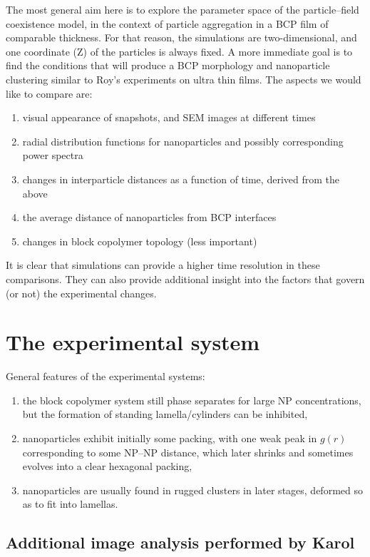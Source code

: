 The most general aim here is to explore the parameter space of the particle--field coexistence model\cite{2008-Sevink-Fraaije, 2012-Langner-Sevink}, in the context of particle aggregation in a BCP film of comparable thickness. For that reason, the simulations are two-dimensional, and one coordinate (Z) of the particles is always fixed. A more immediate goal is to find the conditions that will produce a BCP morphology and nanoparticle clustering similar to Roy's experiments on ultra thin films. The aspects we would like to compare are:
\begin{enumerate}
\setlength{\itemsep}{-2pt}
\item visual appearance of snapshots, and SEM images at different times
\item radial distribution functions for nanoparticles and possibly corresponding power spectra
\item changes in interparticle distances as a function of time, derived from the above
\item the average distance of nanoparticles from BCP interfaces
\item changes in block copolymer topology (less important)
\end{enumerate}

It is clear that simulations can provide a higher time resolution in these comparisons. They can also provide additional insight into the factors that govern (or not) the experimental changes.

\section{The experimental system}

General features of the experimental systems:
\begin{enumerate}
\setlength{\itemsep}{-2pt}
\item the block copolymer system still phase separates for large NP concentrations, but the formation of standing lamella/cylinders can be inhibited,
\item nanoparticles exhibit initially some packing, with one weak peak in $g(r)$ corresponding to some NP--NP distance, which later shrinks and sometimes evolves into a clear hexagonal packing,
\item nanoparticles are usually found in rugged clusters in later stages, deformed so as to fit into lamellas.
\end{enumerate}

\subsection{Additional image analysis performed by Karol}

